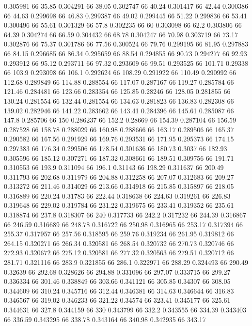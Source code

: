 0.305981 66 35.85
0.304291 66 38.05
0.302747 66 40.24
0.301417 66 42.44
0.300386 66 44.63
0.299698 66 46.83
0.299387 66 49.02
0.299445 66 51.22
0.299836 66 53.41
0.300496 66 55.61
0.301329 66 57.8
0.302235 66 60
0.303098 66 62.2
0.303806 66 64.39
0.304274 66 66.59
0.304432 66 68.78
0.304247 66 70.98
0.303719 66 73.17
0.302876 66 75.37
0.301786 66 77.56
0.300524 66 79.76
0.299195 66 81.95
0.297883 66 84.15
0.296685 66 86.34
0.295659 66 88.54
0.294855 66 90.73
0.294277 66 92.93
0.293912 66 95.12
0.293711 66 97.32
0.293609 66 99.51
0.293525 66 101.71
0.29338 66 103.9
0.293098 66 106.1
0.292624 66 108.29
0.291922 66 110.49
0.290992 66 112.68
0.289849 66 114.88
0.288554 66 117.07
0.287167 66 119.27
0.285784 66 121.46
0.284481 66 123.66
0.283354 66 125.85
0.28246 66 128.05
0.281855 66 130.24
0.281554 66 132.44
0.281554 66 134.63
0.281823 66 136.83
0.282308 66 139.02
0.282946 66 141.22
0.283662 66 143.41
0.284396 66 145.61
0.285087 66 147.8
0.285706 66 150
0.286237 66 152.2
0.28669 66 154.39
0.287104 66 156.59
0.287528 66 158.78
0.288029 66 160.98
0.288666 66 163.17
0.289506 66 165.37
0.290582 66 167.56
0.291929 66 169.76
0.293531 66 171.95
0.295373 66 174.15
0.297383 66 176.34
0.299506 66 178.54
0.301636 66 180.73
0.3037 66 182.93
0.305596 66 185.12
0.307271 66 187.32
0.308661 66 189.51
0.309756 66 191.71
0.310553 66 193.9
0.311094 66 196.1
0.31143 66 198.29
0.311637 66 200.49
0.311793 66 202.68
0.311979 66 204.88
0.312258 66 207.07
0.312683 66 209.27
0.313272 66 211.46
0.314029 66 213.66
0.314918 66 215.85
0.315897 66 218.05
0.316889 66 220.24
0.31783 66 222.44
0.318638 66 224.63
0.319261 66 226.83
0.319648 66 229.02
0.319784 66 231.22
0.319675 66 233.41
0.319352 66 235.61
0.318874 66 237.8
0.318307 66 240
0.317733 66 242.2
0.317232 66 244.39
0.316867 66 246.59
0.316689 66 248.78
0.316722 66 250.98
0.316965 66 253.17
0.317394 66 255.37
0.317957 66 257.56
0.318595 66 259.76
0.319234 66 261.95
0.319812 66 264.15
0.320271 66 266.34
0.320581 66 268.54
0.320732 66 270.73
0.320746 66 272.93
0.320672 66 275.12
0.320581 66 277.32
0.320563 66 279.51
0.320712 66 281.71
0.321116 66 283.9
0.321855 66 286.1
0.322971 66 288.29
0.324493 66 290.49
0.32639 66 292.68
0.328626 66 294.88
0.331096 66 297.07
0.333715 66 299.27
0.336334 66 301.46
0.338849 66 303.66
0.341121 66 305.85
0.34307 66 308.05
0.344609 66 310.24
0.345716 66 312.44
0.346381 66 314.63
0.346644 66 316.83
0.346567 66 319.02
0.346233 66 321.22
0.34574 66 323.41
0.345177 66 325.61
0.344631 66 327.8
0.344159 66 330
0.343799 66 332.2
0.343555 66 334.39
0.343403 66 336.59
0.343295 66 338.78
0.343164 66 340.98
0.342935 66 343.17
